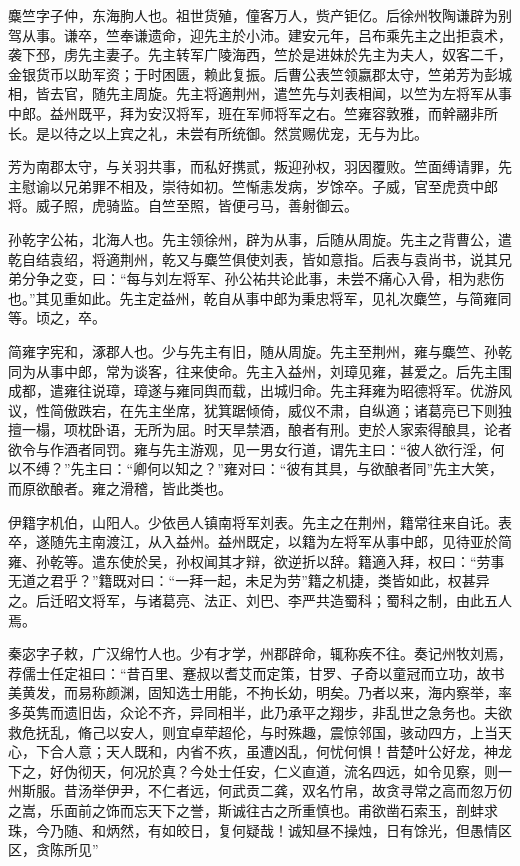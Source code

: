 \documentclass[12pt,UTF8]{ctexbook}
\begin{document}
麋竺字子仲，东海朐人也。祖世货殖，僮客万人，赀产钜亿。后徐州牧陶谦辟为别驾从事。谦卒，竺奉谦遗命，迎先主於小沛。建安元年，吕布乘先主之出拒袁术，袭下邳，虏先主妻子。先主转军广陵海西，竺於是进妹於先主为夫人，奴客二千，金银货币以助军资；于时困匮，赖此复振。后曹公表竺领嬴郡太守，竺弟芳为彭城相，皆去官，随先主周旋。先主将適荆州，遣竺先与刘表相闻，以竺为左将军从事中郎。益州既平，拜为安汉将军，班在军师将军之右。竺雍容敦雅，而幹翮非所长。是以待之以上宾之礼，未尝有所统御。然赏赐优宠，无与为比。

芳为南郡太守，与关羽共事，而私好携贰，叛迎孙权，羽因覆败。竺面缚请罪，先主慰谕以兄弟罪不相及，崇待如初。竺惭恚发病，岁馀卒。子威，官至虎贲中郎将。威子照，虎骑监。自竺至照，皆便弓马，善射御云。

孙乾字公祐，北海人也。先主领徐州，辟为从事，后随从周旋。先主之背曹公，遣乾自结袁绍，将適荆州，乾又与麋竺俱使刘表，皆如意指。后表与袁尚书，说其兄弟分争之变，曰：“每与刘左将军、孙公祐共论此事，未尝不痛心入骨，相为悲伤也。”其见重如此。先主定益州，乾自从事中郎为秉忠将军，见礼次麋竺，与简雍同等。顷之，卒。

简雍字宪和，涿郡人也。少与先主有旧，随从周旋。先主至荆州，雍与麋竺、孙乾同为从事中郎，常为谈客，往来使命。先主入益州，刘璋见雍，甚爱之。后先主围成都，遣雍往说璋，璋遂与雍同舆而载，出城归命。先主拜雍为昭德将军。优游风议，性简傲跌宕，在先主坐席，犹箕踞倾倚，威仪不肃，自纵適；诸葛亮已下则独擅一榻，项枕卧语，无所为屈。时天旱禁酒，酿者有刑。吏於人家索得酿具，论者欲令与作酒者同罚。雍与先主游观，见一男女行道，谓先主曰：“彼人欲行淫，何以不缚？”先主曰：“卿何以知之？”雍对曰：“彼有其具，与欲酿者同”先主大笑，而原欲酿者。雍之滑稽，皆此类也。

伊籍字机伯，山阳人。少依邑人镇南将军刘表。先主之在荆州，籍常往来自讬。表卒，遂随先主南渡江，从入益州。益州既定，以籍为左将军从事中郎，见待亚於简雍、孙乾等。遣东使於吴，孙权闻其才辩，欲逆折以辞。籍適入拜，权曰：“劳事无道之君乎？”籍既对曰：“一拜一起，未足为劳”籍之机捷，类皆如此，权甚异之。后迁昭文将军，与诸葛亮、法正、刘巴、李严共造蜀科；蜀科之制，由此五人焉。

秦宓字子敕，广汉绵竹人也。少有才学，州郡辟命，辄称疾不往。奏记州牧刘焉，荐儒士任定祖曰：“昔百里、蹇叔以耆艾而定策，甘罗、子奇以童冠而立功，故书美黄发，而易称颜渊，固知选士用能，不拘长幼，明矣。乃者以来，海内察举，率多英隽而遗旧齿，众论不齐，异同相半，此乃承平之翔步，非乱世之急务也。夫欲救危抚乱，脩己以安人，则宜卓荦超伦，与时殊趣，震惊邻国，骇动四方，上当天心，下合人意；天人既和，内省不疚，虽遭凶乱，何忧何惧！昔楚叶公好龙，神龙下之，好伪彻天，何况於真？今处士任安，仁义直道，流名四远，如令见察，则一州斯服。昔汤举伊尹，不仁者远，何武贡二龚，双名竹帛，故贪寻常之高而忽万仞之嵩，乐面前之饰而忘天下之誉，斯诚往古之所重慎也。甫欲凿石索玉，剖蚌求珠，今乃随、和炳然，有如皎日，复何疑哉！诚知昼不操烛，日有馀光，但愚情区区，贪陈所见”
\end{document}
